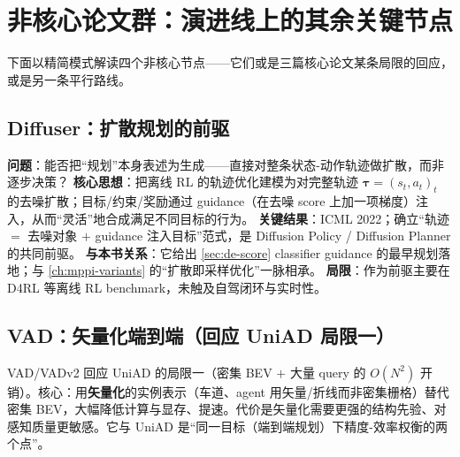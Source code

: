 \section{非核心论文群：演进线上的其余关键节点}
\label{sec:de-rest}

下面以精简模式解读四个非核心节点——它们或是三篇核心论文某条局限的回应，或是另一条平行路线。

\subsection{Diffuser：扩散规划的前驱}
\label{sec:de-diffuser}

\begin{paper}\label{paper:de-diffuser}
\textbf{问题}：能否把“规划”本身表述为生成——直接对整条状态-动作轨迹做扩散，而非逐步决策？
\textbf{核心思想}\cite{janner2022diffuser}：把离线 RL 的轨迹优化建模为对完整轨迹 $\boldsymbol{\tau}=(s_t,a_t)_{t}$ 的去噪扩散；目标/约束/奖励通过 guidance（在去噪 score 上加一项梯度）注入，从而“灵活”地合成满足不同目标的行为。
\textbf{关键结果}：ICML 2022；确立“轨迹 $=$ 去噪对象 $+$ guidance 注入目标”范式，是 Diffusion Policy / Diffusion Planner 的共同前驱。
\textbf{与本书关系}：它给出 \cref{sec:de-score} classifier guidance 的最早规划落地；与 \cref{ch:mppi-variants} 的“扩散即采样优化”一脉相承。
\textbf{局限}：作为前驱主要在 D4RL 等离线 RL benchmark，未触及自驾闭环与实时性。
\end{paper}

\subsection{VAD：矢量化端到端（回应 UniAD 局限一）}
\label{sec:de-vad}

VAD/VADv2\cite{jiang2023vad} 回应 UniAD 的局限一（密集 BEV $+$ 大量 query 的 $O(N^2)$ 开销）。核心：用\textbf{矢量化}的实例表示（车道、agent 用矢量/折线而非密集栅格）替代密集 BEV，大幅降低计算与显存、提速。代价是矢量化需要更强的结构先验、对感知质量更敏感。它与 UniAD 是“同一目标（端到端规划）下精度-效率权衡的两个点”。

